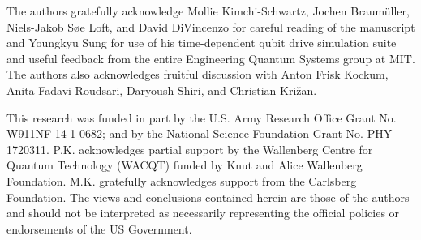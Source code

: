 \documentclass[aip,apr,twocolumn,showpacs,superscriptaddress,groupedaddress,nofootinbib,reprint]{revtex4-1}  %
\begin{document}
\begin{acknowledgments}
The authors gratefully acknowledge Mollie Kimchi-Schwartz, Jochen Braum\"uller, Niels-Jakob S{\o}e Loft, and David DiVincenzo for careful reading of the manuscript and Youngkyu Sung for use of his time-dependent qubit drive simulation suite and useful feedback from the entire Engineering Quantum Systems group at MIT. The authors also acknowledges fruitful discussion with Anton Frisk Kockum, Anita Fadavi Roudsari, Daryoush Shiri, and Christian Kri{\v{z}}an.

This research was funded in part by the U.S. Army Research Office Grant No. W911NF-14-1-0682; and by the National Science Foundation Grant No. PHY-1720311. P.K. acknowledges partial support by the Wallenberg Centre for Quantum Technology (WACQT) funded by Knut and Alice Wallenberg Foundation. M.K. gratefully acknowledges support from the Carlsberg Foundation. The views and conclusions contained herein are those of the authors and should not be interpreted as necessarily representing the official policies or endorsements of the US Government.
\end{acknowledgments}


{}

%
\end{document}
